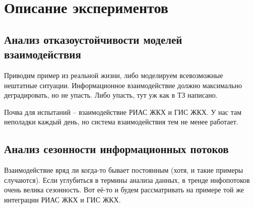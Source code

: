 \section{Описание экспериментов}

\subsection{Анализ отказоустойчивости моделей взаимодействия}

Приводим пример из реальной жизни, либо моделируем всевозможные нештатные ситуации.
Информационное взаимодействие должно максимально деградировать, но не упасть.
Либо упасть, тут уж как в ТЗ написано.

Почва для испытаний -- взаимодействие РИАС ЖКХ и ГИС ЖКХ.
У нас там неполадки каждый день, но система взаимодействия тем не менее работает.

\subsection{Анализ сезонности информационных потоков}

Взаимодействие вряд ли когда-то бывает постоянным (хотя, и такие примеры случаются).
Если углубиться в термины анализа данных, в тренде инфопотоков очень велика сезонность.
Вот её-то и будем рассматривать на примере той же интеграции РИАС ЖКХ и ГИС ЖКХ.

\clearpage
\newpage